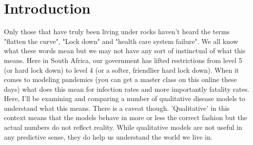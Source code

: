 \section{Introduction}

Only those that have truly been living under rocks haven't heard the terms "flatten the curve", "Lock down" and "health care system failure". We all know what these words mean but we may not have any sort of instinctual of what this means. Here in South Africa, our government has lifted restrictions from level 5 (or hard lock down) to level 4 (or a softer, friendlier hard lock down). When it comes to modeling pandemics (you can get a master class on this online these days) what does this mean for infection rates and more importantly fatality rates. Here, I'll be examining and comparing a number of qualitative disease models to understand what this means. There is a caveat though. 'Qualitative' in this context means that the models behave in more or less the correct fashion but the actual numbers do not reflect reality. While qualitative models are not useful in any predictive sense, they do help us understand the world we live in. 
